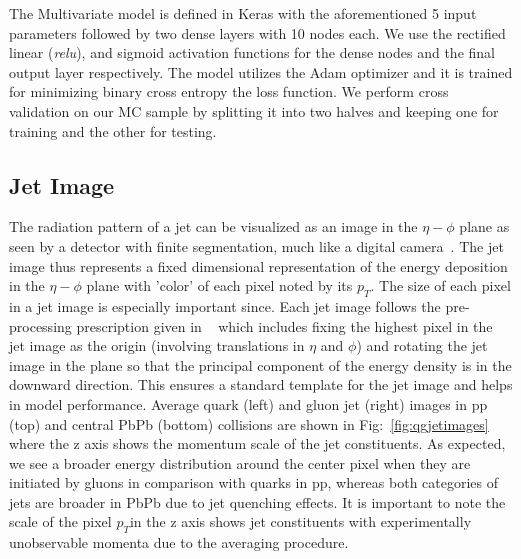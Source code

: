 \documentclass[notoc]{JHEP3}
\newcommand{\pt}{$p_{T}$}
\begin{document}
	The Multivariate model is defined in Keras with the aforementioned 5 input parameters followed by two dense layers with 10 nodes each. We use the rectified linear (\textit{relu}), and sigmoid activation functions for the dense nodes and the final output layer respectively. The model utilizes the Adam optimizer and it is trained for minimizing binary cross entropy the loss function. We perform cross validation on our MC sample by splitting it into two halves and keeping one for training and the other for testing.


\subsection{Jet Image}
\label{sec:image}

	The radiation pattern of a jet can be visualized as an image in the $\eta-\phi$ plane as seen by a detector with finite segmentation, much like a digital camera~\cite{}. The jet image thus represents a fixed dimensional representation of the energy deposition in the $\eta-\phi$ plane with 'color' of each pixel noted by its \pt. The size of each pixel in a jet image is especially important since. Each jet image follows the pre-processing prescription given in ~\cite{deOliveira:2015xxd} which includes fixing the highest pixel in the jet image as the origin (involving translations in $\eta$ and $\phi$) and rotating the jet image in the plane so that the principal component of the energy density is in the downward direction. This ensures a standard template for the jet image and helps in model performance. Average quark (left) and gluon jet (right) images in pp (top) and central PbPb (bottom) collisions are shown in Fig:~\ref{fig:qgjetimages} where the z axis shows the momentum scale of the jet constituents. As expected, we see a broader energy distribution around the center pixel when they are initiated by gluons in comparison with quarks in pp, whereas both categories of jets are broader in PbPb due to jet quenching effects.  It is important to note the scale of the pixel \pt in the z axis shows jet constituents with experimentally unobservable momenta due to the averaging procedure.
\end{document}
